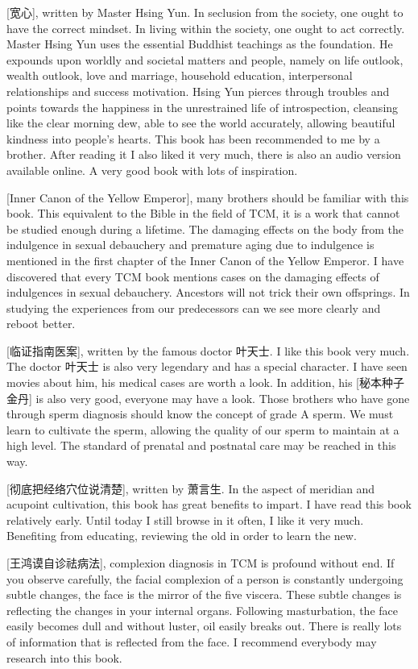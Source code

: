 \documentclass[
]{book}
\begin{document}
{[}宽心{]}, written by Master Hsing Yun. In seclusion from the society, one ought to have the correct mindset. In living within the society, one ought to act correctly. Master Hsing Yun uses the essential Buddhist teachings as the foundation. He expounds upon worldly and societal matters and people, namely on life outlook, wealth outlook, love and marriage, household education, interpersonal relationships and success motivation. Hsing Yun pierces through troubles and points towards the happiness in the unrestrained life of introspection, cleansing like the clear morning dew, able to see the world accurately, allowing beautiful kindness into people's hearts. This book has been recommended to me by a brother. After reading it I also liked it very much, there is also an audio version available online. A very good book with lots of inspiration.

{[}Inner Canon of the Yellow Emperor{]}, many brothers should be familiar with this book. This equivalent to the Bible in the field of TCM, it is a work that cannot be studied enough during a lifetime. The damaging effects on the body from the indulgence in sexual debauchery and premature aging due to indulgence is mentioned in the first chapter of the Inner Canon of the Yellow Emperor. I have discovered that every TCM book mentions cases on the damaging effects of indulgences in sexual debauchery. Ancestors will not trick their own offsprings. In studying the experiences from our predecessors can we see more clearly and reboot better.

{[}临证指南医案{]}, written by the famous doctor 叶天士. I like this book very much. The doctor 叶天士 is also very legendary and has a special character. I have seen movies about him, his medical cases are worth a look. In addition, his {[}秘本种子金丹{]} is also very good, everyone may have a look. Those brothers who have gone through sperm diagnosis should know the concept of grade A sperm. We must learn to cultivate the sperm, allowing the quality of our sperm to maintain at a high level. The standard of prenatal and postnatal care may be reached in this way.

{[}彻底把经络穴位说清楚{]}, written by 萧言生. In the aspect of meridian and acupoint cultivation, this book has great benefits to impart. I have read this book relatively early. Until today I still browse in it often, I like it very much. Benefiting from educating, reviewing the old in order to learn the new.

{[}王鸿谟自诊祛病法{]}, complexion diagnosis in TCM is profound without end. If you observe carefully, the facial complexion of a person is constantly undergoing subtle changes, the face is the mirror of the five viscera. These subtle changes is reflecting the changes in your internal organs. Following masturbation, the face easily becomes dull and without luster, oil easily breaks out. There is really lots of information that is reflected from the face. I recommend everybody may research into this book.
\end{document}
